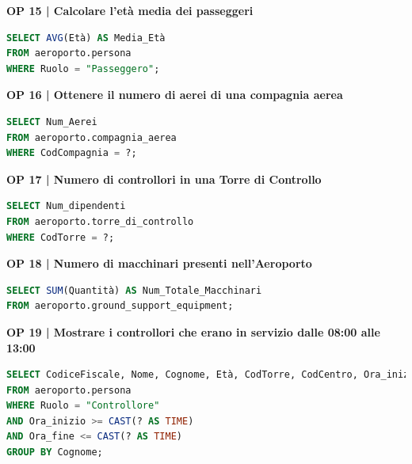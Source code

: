 
\textbf{\small OP 15 | Calcolare l'età media dei passeggeri}\\

\begin{lstlisting}[language=SQL]
SELECT AVG(Età) AS Media_Età
FROM aeroporto.persona
WHERE Ruolo = "Passeggero";	
\end{lstlisting}


\pagebreak

\textbf{\small OP 16 | Ottenere il numero di aerei di una compagnia aerea}\\

\begin{lstlisting}[language=SQL]
SELECT Num_Aerei
FROM aeroporto.compagnia_aerea
WHERE CodCompagnia = ?;	
\end{lstlisting}


\textbf{\small OP 17 | Numero di controllori in una Torre di Controllo}\\

\begin{lstlisting}[language=SQL]
SELECT Num_dipendenti
FROM aeroporto.torre_di_controllo
WHERE CodTorre = ?;	
\end{lstlisting}


\textbf{\small OP 18 | Numero di macchinari presenti nell'Aeroporto}\\

\begin{lstlisting}[language=SQL]
SELECT SUM(Quantità) AS Num_Totale_Macchinari
FROM aeroporto.ground_support_equipment;	
\end{lstlisting}


\textbf{\small OP 19 | Mostrare i controllori che erano in servizio dalle 08:00 alle 13:00}\\

\begin{lstlisting}[language=SQL]
SELECT CodiceFiscale, Nome, Cognome, Età, CodTorre, CodCentro, Ora_inizio, Ora_fine
FROM aeroporto.persona
WHERE Ruolo = "Controllore"
AND Ora_inizio >= CAST(? AS TIME)
AND Ora_fine <= CAST(? AS TIME)
GROUP BY Cognome;	
\end{lstlisting}

